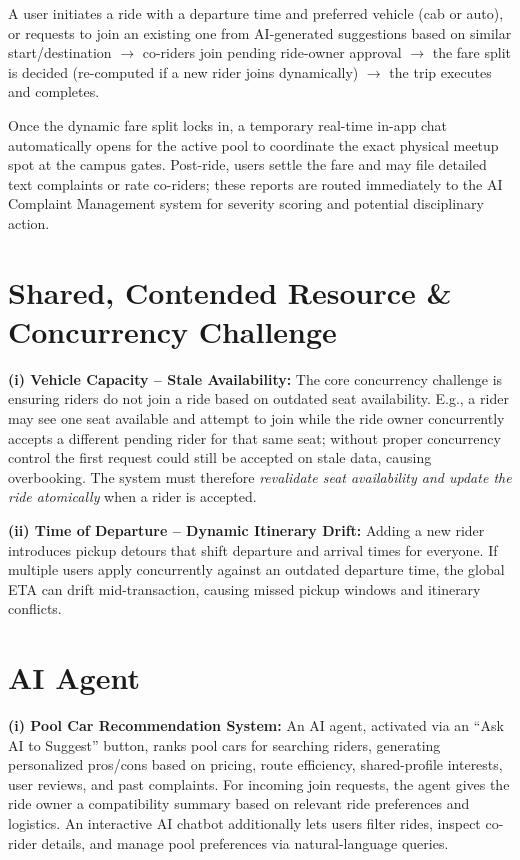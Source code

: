 \documentclass[10pt]{extarticle}
\begin{document}
A user initiates a ride with a departure time and preferred vehicle
(cab or auto), or requests to join an existing one from AI-generated
suggestions based on similar start/destination
$\rightarrow$ co-riders join pending ride-owner approval
$\rightarrow$ the fare split is decided (re-computed if a new rider
joins dynamically) $\rightarrow$ the trip executes and completes.

Once the dynamic fare split locks in, a temporary real-time in-app
chat automatically opens for the active pool to coordinate the exact
physical meetup spot at the campus gates. Post-ride, users settle the
fare and may file detailed text complaints or rate co-riders; these
reports are routed immediately to the AI Complaint Management system
for severity scoring and potential disciplinary action.

\section{Shared, Contended Resource \& Concurrency Challenge}

\textbf{(i) Vehicle Capacity -- Stale Availability:} The core
concurrency challenge is ensuring riders do not join a ride based on
outdated seat availability. E.g., a rider may see one seat available
and attempt to join while the ride owner concurrently accepts a
different pending rider for that same seat; without proper
concurrency control the first request could still be accepted on
stale data, causing overbooking. The system must therefore
\emph{revalidate seat availability and update the ride atomically}
when a rider is accepted.

\textbf{(ii) Time of Departure -- Dynamic Itinerary Drift:} Adding a
new rider introduces pickup detours that shift departure and arrival
times for everyone. If multiple users apply concurrently against an
outdated departure time, the global ETA can drift mid-transaction,
causing missed pickup windows and itinerary conflicts.

\section{AI Agent}

\textbf{(i) Pool Car Recommendation System:} An AI agent, activated
via an ``Ask AI to Suggest'' button, ranks pool cars for searching
riders, generating personalized pros/cons based on pricing, route
efficiency, shared-profile interests, user reviews, and past
complaints. For incoming join requests, the agent gives the ride
owner a compatibility summary based on relevant ride preferences and
logistics. An interactive AI chatbot additionally lets users filter
rides, inspect co-rider details, and manage pool preferences via
natural-language queries.
\end{document}
